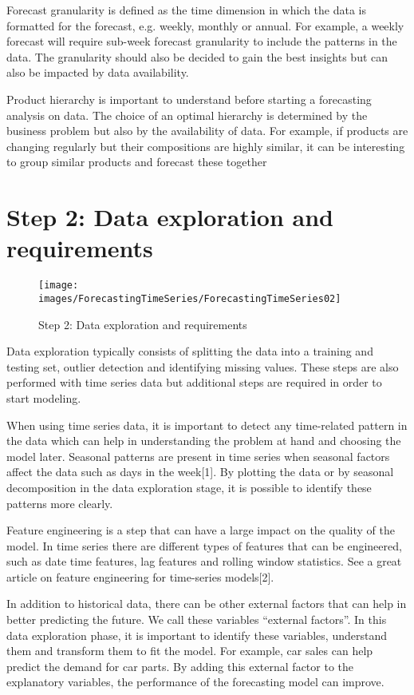 Forecast granularity is defined as the time dimension in which the data is formatted for the forecast, e.g. weekly, monthly or annual. For example, a weekly forecast will require sub-week forecast granularity to include the patterns in the data. The granularity should also be decided to gain the best insights but can also be impacted by data availability.

Product hierarchy is important to understand before starting a forecasting analysis on data. The choice of an optimal hierarchy is determined by the business problem but also by the availability of data. For example, if products are changing regularly but their compositions are highly similar, it can be interesting to group similar products and forecast these together

\section{Step 2: Data exploration and requirements}

\begin{figure}
    \texttt{[image: images/ForecastingTimeSeries/ForecastingTimeSeries02]}
    \caption{Step 2: Data exploration and requirements} \label{ForecastingTimeSeries02}
\end{figure}


Data exploration typically consists of splitting the data into a training and testing set, outlier detection and identifying missing values. These steps are also performed with time series data but additional steps are required in order to start modeling.

When using time series data, it is important to detect any time-related pattern in the data which can help in understanding the problem at hand and choosing the model later. Seasonal patterns are present in time series when seasonal factors affect the data such as days in the week[1]. By plotting the data or by seasonal decomposition in the data exploration stage, it is possible to identify these patterns more clearly.

Feature engineering is a step that can have a large impact on the quality of the model. In time series there are different types of features that can be engineered, such as date time features, lag features and rolling window statistics. See a great article on feature engineering for time-series models[2].

In addition to historical data, there can be other external factors that can help in better predicting the future. We call these variables “external factors”. In this data exploration phase, it is important to identify these variables, understand them and transform them to fit the model. For example, car sales can help predict the demand for car parts. By adding this external factor to the explanatory variables, the performance of the forecasting model can improve.

